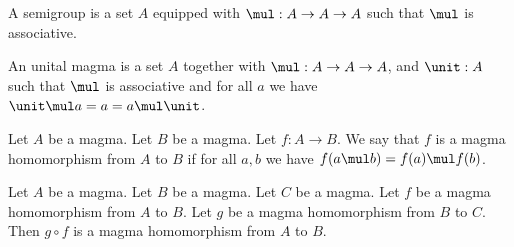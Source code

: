 \begin{theory}
   A semigroup is a set $A$
   equipped with $\mul : A\to A\to A$
   such that $\mul$ is associative.
\end{theory}


\begin{theory}
   An unital magma is a set $A$
   together with $\mul : A\to A\to A$,
   and $\unit : A$
   such that $\mul$ is associative
   and for all $a$ we have $\unit\mul a = a = a\mul\unit$.
\end{theory}

%
\begin{definition}
   Let $A$ be a magma.
   Let $B$ be a magma.
   Let $f : A\to B$.
   We say that $f$ is a magma homomorphism from $A$ to $B$ if
   for all $a, b$ we have $f(a\mul b) = f(a)\mul f(b)$.
\end{definition}


\begin{theorem}
   Let $A$ be a magma.
   Let $B$ be a magma.
   Let $C$ be a magma.
   Let $f$ be a magma homomorphism from $A$ to $B$.
   Let $g$ be a magma homomorphism from $B$ to $C$.
   Then $g\circ f$ is a magma homomorphism from $A$ to $B$.
\end{theorem}
